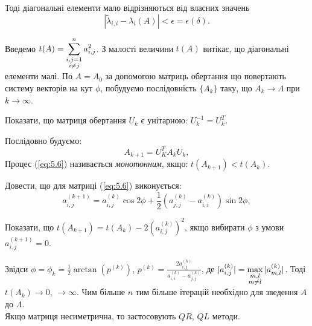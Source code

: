 Тоді діагональні елементи мало відрізняються від власних значень \[ |\tilde \lambda_{i,i} - \lambda_i(A) | < \epsilon = \epsilon(\delta). \]

Введемо $t(A) = \displaystyle\sum\limits_{\substack{i, j = 1 \\ i \ne j}}^n a_{i,j}^2$. З малості величини $t(A)$ витікає, що діагональні елементи малі. По $A = A_0$ за допомогою матриць обертання %
що повертають систему векторів на кут $\phi$, побудуємо послідовність $\{A_k\}$ таку, що $A_k \to \Lambda$ при $k\to\infty$.

\begin{problem}
	Показати, що матриця обертання $U_k$ є унітарною: $U_k^{-1} = U_k^T$.
\end{problem}

Послідовно будуємо:
\begin{equation}
	\label{eq:5.6}
	A_{k+1} = U_K^T A_k U_k,
\end{equation}
Процес (\ref{eq:5.6}) називається \textit{монотонним}, якщо: $t(A_{k+1})<t(A_k)$.

\begin{problem}
Довести, що для матриці (\ref{eq:5.6}) виконується:
\begin{equation}
	\label{eq:5.7}
	a_{i,j}^{(k+1)} = a_{i,j}^{(k)} \cos 2 \phi + \dfrac12 (a_{j,j}^{(k)} - a_{i,i}^{(k)}) \sin 2 \phi,
\end{equation}

Показати, що $t(A_{k+1})=t(A_k)-2(a_{i,j}^{(k)})^2$, якщо вибирати $\phi$ з умови $a_{i,j}^{(k+1)} = 0$.
\end{problem}

Звідси $\phi = \phi_k = \frac12 \arctan(p^{(k)})$, $p^{(k)} = \frac{2a_{i,j}^{(k)}}{a_{i,i}^{(k)}-a_{j,j}^{(k)}}$, де $|a_{i,j}^{(k)}| = \displaystyle\max\limits_{\substack{m,l \\ m \ne l}} |a_{m,l}^{(k)}|$. Тоді
$t(A_k) \to 0$, $\to \infty$. Чим більше $n$ тим більше ітерацій необхідно для зведення $A$ до $\Lambda$. \\

Якщо матриця несиметрична, то застосовують $QR$, $QL$ методи.